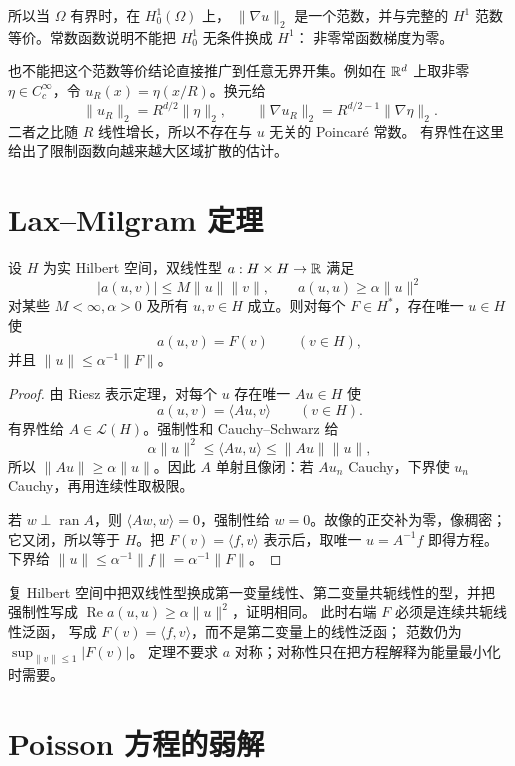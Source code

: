 所以当 \(\Omega\) 有界时，在 \(H_0^1(\Omega)\) 上，
\(\|\nabla u\|_2\) 是一个范数，并与完整的
\(H^1\) 范数等价。常数函数说明不能把 \(H_0^1\) 无条件换成 \(H^1\)：
非零常函数梯度为零。

也不能把这个范数等价结论直接推广到任意无界开集。例如在 \(\mathbb{R}^d\)
上取非零 \(\eta\in C_c^\infty\)，令 \(u_R(x)=\eta(x/R)\)。换元给
\[
 \|u_R\|_2=R^{d/2}\|\eta\|_2,\qquad
 \|\nabla u_R\|_2=R^{d/2-1}\|\nabla\eta\|_2.
\]
二者之比随 \(R\) 线性增长，所以不存在与 \(u\) 无关的 Poincaré 常数。
有界性在这里给出了限制函数向越来越大区域扩散的估计。

\section{Lax--Milgram 定理}

\begin{theorem}\label{thm:lax-milgram}
设 \(H\) 为实 Hilbert 空间，双线性型 \(a:H\times H\to\mathbb{R}\) 满足
\[
 |a(u,v)|\le M\|u\|\|v\|,\qquad
 a(u,u)\ge\alpha\|u\|^2
\]
对某些 \(M<\infty,\alpha>0\) 及所有 \(u,v\in H\) 成立。则对每个
\(F\in H^*\)，存在唯一 \(u\in H\) 使
\[
 a(u,v)=F(v)\qquad(v\in H),
\]
并且 \(\|u\|\le\alpha^{-1}\|F\|\)。
\end{theorem}
\begin{proof}
由 Riesz 表示定理，对每个 \(u\) 存在唯一 \(Au\in H\) 使
\[
 a(u,v)=\langle Au,v\rangle\qquad(v\in H).
\]
有界性给 \(A\in\mathcal L(H)\)。强制性和 Cauchy--Schwarz 给
\[
 \alpha\|u\|^2\le\langle Au,u\rangle\le\|Au\|\|u\|,
\]
所以 \(\|Au\|\ge\alpha\|u\|\)。因此 \(A\) 单射且像闭：若
\(Au_n\) Cauchy，下界使 \(u_n\) Cauchy，再用连续性取极限。

若 \(w\perp\operatorname{ran}A\)，则
\(\langle Aw,w\rangle=0\)，强制性给 \(w=0\)。故像的正交补为零，像稠密；
它又闭，所以等于 \(H\)。把 \(F(v)=\langle f,v\rangle\) 表示后，取唯一
\(u=A^{-1}f\) 即得方程。下界给
\(\|u\|\le\alpha^{-1}\|f\|=\alpha^{-1}\|F\|\)。
\end{proof}

复 Hilbert 空间中把双线性型换成第一变量线性、第二变量共轭线性的型，并把
强制性写成 \(\operatorname{Re}a(u,u)\ge\alpha\|u\|^2\)，证明相同。
此时右端 \(F\) 必须是连续共轭线性泛函，
写成 \(F(v)=\langle f,v\rangle\)，而不是第二变量上的线性泛函；
范数仍为 \(\sup_{\|v\|\le1}|F(v)|\)。
定理不要求 \(a\) 对称；对称性只在把方程解释为能量最小化时需要。

\section{Poisson 方程的弱解}

